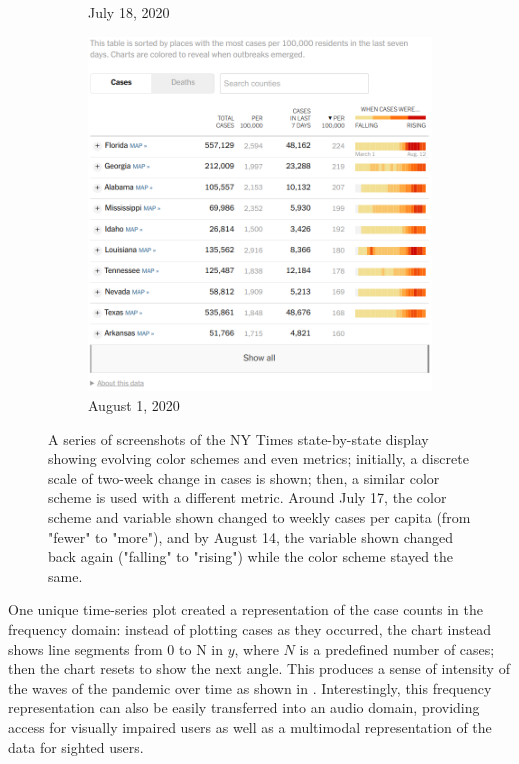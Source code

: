 \documentclass[article]{jdssv}\usepackage[]{graphicx}\usepackage[]{xcolor}
\begin{document}
\begin{figure}
\begin{subfigure}[t]{.25\textwidth}
\caption{July 18, 2020}\label{fig:nyt-colors3}
\end{subfigure}\hfill
\begin{subfigure}[t]{.25\textwidth}
\includegraphics[width=\textwidth]{nyt-wayback-20200814}
\caption{August 1, 2020}\label{fig:nyt-colors4}
\end{subfigure}\hfill
\caption{A series of screenshots of the NY Times state-by-state display showing evolving color schemes and even metrics; initially, a discrete scale of two-week change in cases is shown; then, a similar color scheme is used with a different metric. Around July 17, the color scheme and variable shown changed to weekly cases per capita (from "fewer" to "more"), and by August 14, the variable shown changed back again ("falling" to "rising") while the color scheme stayed the same.}\label{fig:sparklines-heatmap-nyt}
\end{figure}

One unique time-series plot created a representation of the case counts in the frequency domain: instead of plotting cases as they occurred, the chart instead shows line segments from 0 to N in $y$, where $N$ is a predefined number of cases; then the chart resets to show the next angle. This produces a sense of intensity of the waves of the pandemic over time as shown in . Interestingly, this frequency representation can also be easily transferred into an audio domain, providing access for visually impaired users as well as a multimodal representation of the data for sighted users. 
\end{document}
